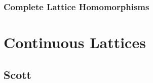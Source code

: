\documentclass{book}
\begin{document}
	
	
	
	
	
	
	\section{Complete Lattice Homomorphisms}
	
	
	
	
	
	
	
	
	
	
	
	
	
	
	
	
	
	
	
	
	
	
	
	
	
	
	
	
	
	
	
	
	
	
	
	
	
	
	
	
	
	
	
	
	
	
	
	
	
	
	
	
	
	
	
	
	
	
	
	
	
	
	
	
	
	
	
	
	
	
	
	
	
	
	
	
	
	\part{Continuous Lattices}
	
	 \cite{gierz2003continuous}
	
	\chapter{Scott}
	
	\begin{defn}
		
	\end{defn}
	
\end{document}
